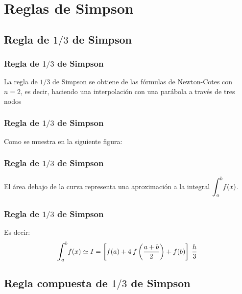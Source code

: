 \documentclass[12pt]{beamer}
\begin{document}
\section{Reglas de Simpson}
\subsection{Regla de \texorpdfstring{$1/3$}{1/3} de Simpson}

\begin{frame}
\frametitle{Regla de $1/3$ de Simpson}
La regla de $1/3$ de Simpson se obtiene de las fórmulas de Newton-Cotes con $n = 2$, \pause es decir, haciendo una interpolación con una parábola a través de tres nodos
\end{frame}
\begin{frame}
\frametitle{Regla de $1/3$ de Simpson}
Como se muestra en la siguiente figura:
\begin{figure}
	\centering
	
\end{figure}
\end{frame}
\begin{frame}
\frametitle{Regla de $1/3$ de Simpson}
\begin{figure}
	\centering
	
\end{figure}
El área debajo de la curva representa una aproximación a la integral $\scaleint{6ex}_{\bs a}^{b} f (x)$.
\end{frame}
\begin{frame}
\frametitle{Regla de $1/3$ de Simpson}
Es decir:
\begin{align*}
\scaleint{6ex}_{\bs a}^{b} f (x) \simeq I = \left[ f (a) + 4 \: f \left( \dfrac{a + b}{2} \right) + f (b) \right] \: \dfrac{h}{3}
\end{align*}
\end{frame}

\subsection{Regla compuesta de \texorpdfstring{$1/3$}{1/3} de Simpson}
\end{document}
